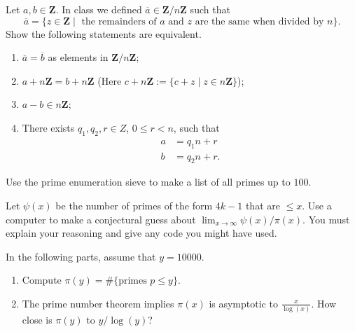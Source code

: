 \documentclass{exam}
\newcommand{\ol}[1]{\overline{#1}}
\newcommand{\Z}{\mathbb Z}
\newcommand{\vl}{\; | \;}
\newcommand{\ds}{\displaystyle}
\renewcommand{\mathbb}{\mathbf}
\begin{document}
\begin{questions}
	\question[15] Let $a,b \in \Z$. In class we defined $\ol a \in \Z/n\Z$ such that 
	\[
		\ol a = \{ z \in \Z \vl \text{ the remainders of } a \text{ and } z \text{ are the same when divided by } n  \}.
	\]
	Show the following statements are equivalent. 
		\begin{enumerate}
			\item $\ol a = \ol b$ as elements in $\Z/n\Z$;
			\item $a + n\Z = b + n\Z$ (Here $c+n\Z := \{ c+ z \vl z \in n\Z\}$); 
			\item $a-b \in n\Z$;
			\item There exists $q_1, q_2,r \in Z$, $0 \leqslant r < n$, such that 
				\begin{align*}
					a &= q_1 n + r \\
					b &= q_2 n + r.
				\end{align*}
		\end{enumerate}


	\question[5] Use the prime enumeration sieve to make a list of all primes up to $100$.



	\question[5] Let $\psi(x)$ be the number of primes of the form $4k-1$ that are $\leq x$.  Use a computer to make a conjectural guess about $\lim_{x\to\infty} \psi(x) / \pi(x)$. You must explain your reasoning and give any code you might have used. 


	\question[5] In the following parts, assume that $y = 10000$.
		\begin{enumerate}
			\item Compute $\pi(y) = \#\{ \text{primes } p \leq y\}.$
			\item The prime number theorem implies $\pi(x)$ is asymptotic to $\ds \frac{x}{\log(x)}$.  How close is $\pi(y)$ to $y/\log(y)$?
		\end{enumerate}


\end{questions}
\end{document}
